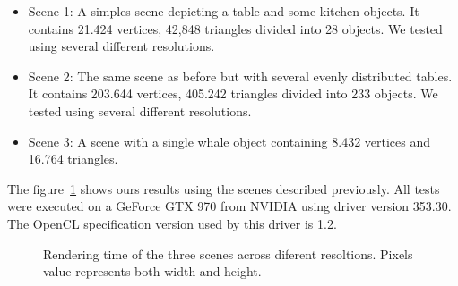 \documentclass{vgtc}
\begin{document}
\begin{itemize}
\item Scene 1: A simples scene depicting a table and some kitchen objects. It
  contains 21.424 vertices, 42,848 triangles divided into 28
  objects. We tested using several different resolutions.
\item Scene 2: The same scene as before but with several evenly
  distributed tables. It contains 203.644 vertices, 405.242 triangles
  divided into 233 objects. We tested using several different
  resolutions.
\item Scene 3: A scene with a single whale object containing 8.432
  vertices and 16.764 triangles.
\end{itemize}

The figure~\ref{fig:scenes-results} shows ours results using the
scenes described previously. All tests were executed on a GeForce GTX
970 from NVIDIA using driver version 353.30. The OpenCL specification
version used by this driver is 1.2.

\begin{figure}
\centering
{}
\caption{Rendering time of the three scenes across diferent
  resoltions. Pixels value represents both width and height.}
\label{fig:scenes-results}
\end{figure}
\end{document}
